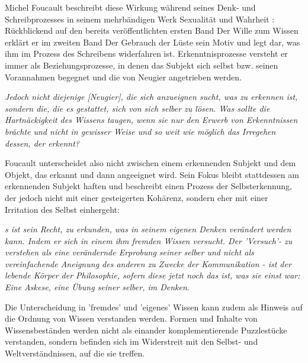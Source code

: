  Michel
Foucault beschreibt diese Wirkung während seines Denk- und Schreibprozesses in
seinem mehrbändigen Werk \glqq Sexualität und Wahrheit\grqq\footnotemark
{}: Rückblickend auf den
bereits veröffentlichten ersten Band \glqq Der Wille zum Wissen\grqq
\footnotemark {} erklärt er im
zweiten Band \glqq Der Gebrauch der Lüste\grqq\footnotemark
{} sein Motiv und legt dar, was ihm im
Prozess des Schreibens widerfahren ist. Erkenntnisprozesse versteht er immer als Beziehungsprozesse, in denen das Subjekt sich selbst bzw. seinen Vorannahmen begegnet und die von Neugier angetrieben werden.
\begin{myenv}
  \textit{Jedoch \glqq [...] nicht diejenige [Neugier], die sich anzueignen
  sucht, was zu erkennen ist, sondern die, die es gestattet, sich von sich
selber zu lösen. Was sollte die Hartnäckigkeit des Wissens taugen, wenn sie nur
den Erwerb von Erkenntnissen brächte und nicht in gewisser Weise und so weit
wie möglich das Irregehen dessen, der erkennt?\grqq}\footnotemark{}
\end{myenv}
Foucault unterscheidet also nicht zwischen einem erkennenden Subjekt und dem Objekt, das erkannt und dann angeeignet wird. Sein Fokus bleibt stattdessen am erkennenden Subjekt haften und beschreibt einen Prozess der Selbsterkennung, der jedoch nicht mit einer gesteigerten Kohärenz, sondern eher mit einer Irritation des Selbst einhergeht: 
\begin{myenv}
  \textit{ 
    \glqq [E]s ist sein Recht, zu erkunden, was in seinem eigenen Denken verändert
    werden kann. Indem er sich in einem ihm fremden Wissen versucht. Der
    'Versuch'- zu verstehen als eine verändernde Erprobung seiner selber und 
    nicht als vereinfachende Aneignung des anderen zu Zwecke der Kommunikation
    - ist der lebende Körper der Philosophie, sofern diese jetzt noch das ist,
    was sie einst war: Eine Askese, eine Übung seiner selber, im Denken.\grqq\footnotemark
  }
\end{myenv}
Die Unterscheidung in 'fremdes' und 'eigenes' 
Wissen kann zudem als Hinweis auf die Ordnung von Wissen verstanden werden. Formen und Inhalte von Wissensbeständen werden nicht als einander komplementierende Puzzlestücke verstanden, sondern befinden sich im Widerstreit mit den Selbst- und Weltverständnissen, auf die sie treffen.\\

